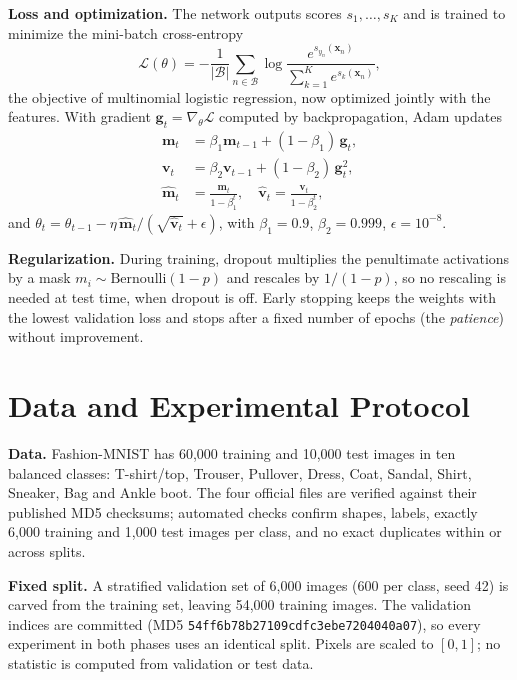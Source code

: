 \documentclass[conference]{IEEEtran}
\begin{document}
\textbf{Loss and optimization.} The network outputs scores $s_1,\dots,s_K$ and is trained to minimize the mini-batch
cross-entropy
\begin{equation}
  \mathcal{L}(\theta) = -\frac{1}{|\mathcal{B}|}\sum_{n\in\mathcal{B}} \log \frac{e^{s_{y_n}(\mathbf{x}_n)}}{\sum_{k=1}^{K} e^{s_k(\mathbf{x}_n)}},
  \label{eq:ce}
\end{equation}
the objective of multinomial logistic regression, now optimized jointly with the features. With gradient
$\mathbf{g}_t=\nabla_\theta\mathcal{L}$ computed by backpropagation, Adam
updates
\begin{equation}
  \begin{aligned}
    \mathbf{m}_t &= \beta_1\mathbf{m}_{t-1}+(1-\beta_1)\,\mathbf{g}_t,\\
    \mathbf{v}_t &= \beta_2\mathbf{v}_{t-1}+(1-\beta_2)\,\mathbf{g}_t^{2},\\
    \hat{\mathbf{m}}_t &= \frac{\mathbf{m}_t}{1-\beta_1^t},\quad
    \hat{\mathbf{v}}_t = \frac{\mathbf{v}_t}{1-\beta_2^t},
  \end{aligned}
  \label{eq:adam}
\end{equation}
and $\theta_t=\theta_{t-1}-\eta\,\hat{\mathbf{m}}_t/(\sqrt{\hat{\mathbf{v}}_t}+\epsilon)$, with $\beta_1=0.9$,
$\beta_2=0.999$, $\epsilon=10^{-8}$.

\textbf{Regularization.} During training, dropout multiplies the penultimate activations by
a mask $m_i\sim\mathrm{Bernoulli}(1-p)$ and rescales by $1/(1-p)$, so no rescaling is needed at test time, when dropout
is off. Early stopping keeps the weights with the lowest validation loss and stops after a fixed
number of epochs (the \emph{patience}) without improvement.

\section{Data and Experimental Protocol}
\label{sec:protocol}

\textbf{Data.} Fashion-MNIST has 60{,}000 training and 10{,}000 test images in ten balanced classes: T-shirt/top,
Trouser, Pullover, Dress, Coat, Sandal, Shirt, Sneaker, Bag and Ankle boot. The four official files are verified against
their published MD5 checksums; automated checks confirm shapes, labels, exactly 6{,}000 training and 1{,}000 test images
per class, and no exact duplicates within or across splits.

\textbf{Fixed split.} A stratified validation set of 6{,}000 images (600 per class, seed 42) is carved from the
training set, leaving 54{,}000 training images. The validation indices are committed (MD5
\texttt{54ff6b78\allowbreak b27109cd\allowbreak fc3ebe72\allowbreak 04040a07}), so every experiment in both phases uses
an identical split. Pixels are scaled to $[0,1]$; no statistic is computed from validation or test data.
\end{document}
